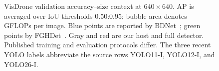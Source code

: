 \begin{figure}[t]
\centering
{}
\caption{VisDrone validation accuracy--size context at $640\times640$. AP is averaged over IoU thresholds 0.50:0.95; bubble area denotes GFLOPs per image. Blue points are reported by BDNet~\cite{guan2026bdnet}; green points by FGHDet~\cite{bi2025fghdet}. Gray and red are our host and full detector. Published training and evaluation protocols differ. The three recent YOLO labels abbreviate the source rows YOLO11-I, YOLO12-I, and YOLO26-I.}
\label{fig:bubble}
\end{figure}
